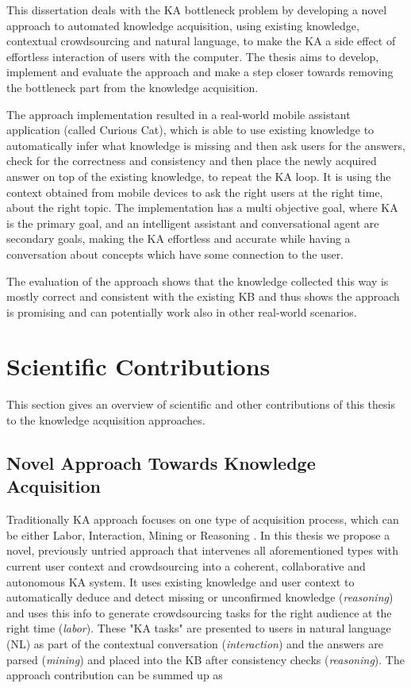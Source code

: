 This dissertation deals with the KA bottleneck problem by developing a novel
approach to automated knowledge acquisition, using existing knowledge,
contextual crowdsourcing and natural language, to make the KA a side effect of
effortless interaction of users with the computer. The thesis aims to develop,
implement and evaluate the approach and make a step closer towards removing the
bottleneck part from the knowledge acquisition.

The approach implementation resulted in a real-world mobile assistant 
application (called Curious Cat), which is able to use existing knowledge to 
automatically infer 
what knowledge is missing and then ask users for the answers, check for
the correctness and consistency and then place the newly acquired answer on
top of the existing knowledge, to repeat the KA loop. It is
using the context obtained from mobile devices to ask the right users at the 
right time, about the right topic. 
The implementation has a multi objective goal, 
where KA is the primary goal, and an intelligent assistant and conversational 
agent are secondary goals, making the KA effortless and accurate while having a 
conversation about concepts which have some connection to the user.

The evaluation of the approach shows that the knowledge collected this way is
mostly correct and consistent with the existing KB and thus shows the approach
is promising and can potentially work also in other real-world scenarios.

\section{Scientific Contributions}
This section gives an overview of scientific and other contributions of this 
thesis to the knowledge acquisition approaches.

\subsection{Novel Approach Towards Knowledge Acquisition}
Traditionally KA approach focuses on one type of 
acquisition process, which can be either Labor, Interaction, Mining or 
Reasoning \parencite{Zang2013}. In this thesis we propose a novel, previously 
untried approach that intervenes all aforementioned types with current user 
context and crowdsourcing into a coherent, collaborative and autonomous 
KA system. It uses existing knowledge and user context to automatically 
deduce and detect missing or unconfirmed knowledge (\emph{reasoning}) and uses 
this info to generate crowdsourcing tasks for the right audience at the right 
time (\emph{labor}). These "KA tasks" are presented to users in natural language
(NL) as part of the contextual conversation (\emph{interaction}) and the 
answers are parsed (\emph{mining}) and placed into the KB after consistency 
checks (\emph{reasoning}). The approach contribution can be summed up as

